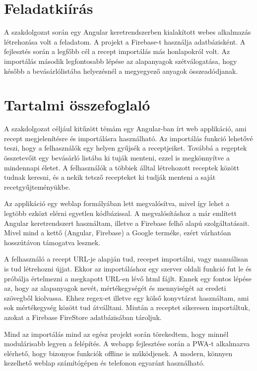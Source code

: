 \documentclass[12pt]{report}
\theoremstyle{definition}
\begin{document}
\chapter*{Feladatkiírás}

A szakdolgozat során egy Angular keretrendszerben kialakított webes alkalmazás létrehozása volt a feladatom.
A projekt a Firebase-t használja adatbázisként. A fejlesztés során a legfőbb cél a recept importálás más honlapokról volt.
Az importálás második legfontosabb lépése az alapanyagok szétválogatása,
hogy később a bevásárlólistába helyezésnél a megyegyező anyagok összeadódjanak.

\chapter*{Tartalmi összefoglaló}

A szakdolgozat céljául kitűzött témám egy Angular-ban írt web applikáció,
ami recept megjelenítésre és importálásra használható. Az importálás funkció lehetővé teszi,
hogy a felhasználók egy helyen gyűjsék a receptjeiket. Továbbá a regeptek összetevőit egy bevásárló listába ki tuják menteni,
ezzel is megkönnyítve a mindennapi életet.
A felhasználók a többiek álltal létrehozott receptek között tudnak keresni,
és a nekik tetsző recepteket ki tudják menteni a saját recetgyűjteményükbe.

Az applikáció egy weblap formályában lett megvalósítva, mivel így lehet a legtöbb ezközt elérni egyetlen kódbázissal.
A megvalósításhoz a már említett Angular keretrendszert használtam, illetve a Firebase felhő alapú szolgáltatásait.
Mivel mind a kettő (Angular, Firebase) a Google terméke, ezért várhatóan hosszútávon támogatva lesznek.

A felhasználó a recept URL-je alapján tud, recepet importálni, vagy manuálisan is tud létrehozni újjat. %
Ekkor az importáláshoz egy szerver oldali funkció fut le és próbálja értelmezni a megkapott URL-en lévő html fájlt.
Ennek egy fontos lépése az, hogy az alapanyagok nevét, mértékegységét és mennyiségét az eredeti szövegből kiolvassa.
Ehhez regex-et illetve egy kölső konyvtárat használtam, ami sok mértékegység között tud átválltani.
Miután a receptet sikeresen importáltuk, azokat a Firebase FireStore adatbázisában tároljuk.

Mind az importálás mind az egész projekt során törekedtem, hogy minnél modulárisabb legyen a felépítés.
A webapp fejlesztése során a PWA-t alkalmazva elérhető, hogy bizonyos funkciók offline is működjenek.
A modern, könnyen kezelhető weblap számítógépen és telefonon egyaránt használható.
\end{document}
